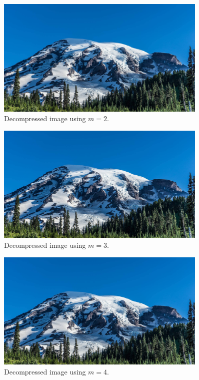 \begin{figure}[h]
    \centering
    \includegraphics[width=0.9\textwidth]{../Report Images/decompressedImage_m2.png}
    \caption{Decompressed image using $m=2$.}
    \label{fig:decompressed_img_m2}
\end{figure}

\begin{figure}[h]
    \centering
    \includegraphics[width=0.9\textwidth]{../Report Images/decompressedImage_m3.png}
    \caption{Decompressed image using $m=3$.}
    \label{fig:decompressed_img_m3}
\end{figure}

\begin{figure}[h]
    \centering
    \includegraphics[width=0.9\textwidth]{../Report Images/decompressedImage_m4.png}
    \caption{Decompressed image using $m=4$.}
    \label{fig:decompressed_img_m4}
\end{figure}

